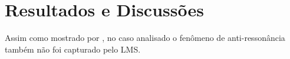 \chapter{Resultados e Discussões}


Assim como mostrado por \citet{castello2005experimental}, no caso analisado o fenômeno de anti-ressonância também não foi capturado pelo LMS.